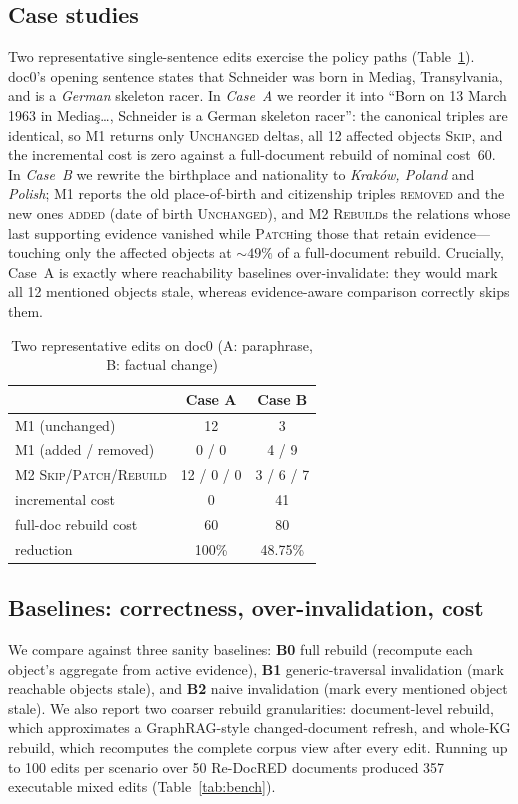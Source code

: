 \documentclass[conference]{IEEEtran}
\begin{document}
\subsection{Case studies}
Two representative single-sentence edits exercise the policy paths
(Table~\ref{tab:case}). doc0's opening sentence states that Schneider was born
in Media\c{s}, Transylvania, and is a \emph{German} skeleton racer. In
\emph{Case~A} we reorder it into ``Born on 13 March 1963 in
Media\c{s}\dots{}, Schneider is a German skeleton racer'': the canonical
triples are identical, so M1 returns only \textsc{Unchanged} deltas, all 12
affected objects \textsc{Skip}, and the incremental cost is zero against a
full-document rebuild of nominal cost~60. In \emph{Case~B} we rewrite the
birthplace and nationality to \emph{Krak\'ow, Poland} and \emph{Polish}; M1
reports the old place-of-birth and citizenship triples \textsc{removed} and the
new ones \textsc{added} (date of birth \textsc{Unchanged}), and M2
\textsc{Rebuild}s the relations whose last supporting evidence vanished while
\textsc{Patch}ing those that retain evidence---touching only the affected
objects at $\sim$$49\%$ of a full-document rebuild. Crucially, Case~A is exactly
where reachability baselines over-invalidate: they would mark all 12 mentioned
objects stale, whereas evidence-aware comparison correctly skips them.

\begin{table}[t]
\caption{Two representative edits on doc0 (A: paraphrase, B: factual change)}
\label{tab:case}
\centering
\footnotesize
\setlength{\tabcolsep}{4pt}
\begin{tabular}{lcc}
\toprule
& \textbf{Case A} & \textbf{Case B}\\
\midrule
M1 (unchanged) & 12 & 3\\
M1 (added / removed) & 0 / 0 & 4 / 9\\
M2 \textsc{Skip}/\textsc{Patch}/\textsc{Rebuild} & 12 / 0 / 0 & 3 / 6 / 7\\
incremental cost & 0 & 41\\
full-doc rebuild cost & 60 & 80\\
reduction & 100\% & 48.75\%\\
\bottomrule
\end{tabular}
\end{table}


\subsection{Baselines: correctness, over-invalidation, cost}
We compare against three sanity baselines: \textbf{B0} full rebuild (recompute
each object's aggregate from active evidence), \textbf{B1} generic-traversal
invalidation (mark reachable objects stale), and \textbf{B2} naive invalidation
(mark every mentioned object stale). We also report two coarser rebuild
granularities: document-level rebuild, which approximates a GraphRAG-style
changed-document refresh, and whole-KG rebuild, which recomputes the complete
corpus view after every edit. Running up to 100 edits per scenario over 50
Re-DocRED documents produced 357 executable mixed edits (Table~\ref{tab:bench}).
\end{document}
